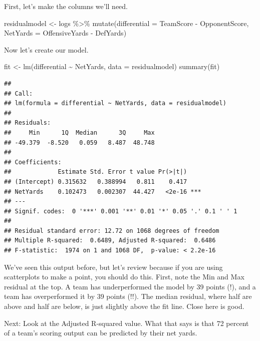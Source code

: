 \documentclass[
]{book}
\newenvironment{Shaded}{\begin{snugshade}}{\end{snugshade}}
\newcommand{\AttributeTok}[1]{\textcolor[rgb]{0.77,0.63,0.00}{#1}}
\newcommand{\FunctionTok}[1]{\textcolor[rgb]{0.00,0.00,0.00}{#1}}
\newcommand{\NormalTok}[1]{#1}
\newcommand{\OtherTok}[1]{\textcolor[rgb]{0.56,0.35,0.01}{#1}}
\newcommand{\SpecialCharTok}[1]{\textcolor[rgb]{0.00,0.00,0.00}{#1}}
\begin{document}
First, let's make the columns we'll need.

\begin{Shaded}
\begin{Highlighting}[]
\NormalTok{residualmodel }\OtherTok{\textless{}{-}}\NormalTok{ logs }\SpecialCharTok{\%\textgreater{}\%} \FunctionTok{mutate}\NormalTok{(}\AttributeTok{differential =}\NormalTok{ TeamScore }\SpecialCharTok{{-}}\NormalTok{ OpponentScore, }\AttributeTok{NetYards =}\NormalTok{ OffensiveYards }\SpecialCharTok{{-}}\NormalTok{ DefYards)}
\end{Highlighting}
\end{Shaded}

Now let's create our model.

\begin{Shaded}
\begin{Highlighting}[]
\NormalTok{fit }\OtherTok{\textless{}{-}} \FunctionTok{lm}\NormalTok{(differential }\SpecialCharTok{\textasciitilde{}}\NormalTok{ NetYards, }\AttributeTok{data =}\NormalTok{ residualmodel)}
\FunctionTok{summary}\NormalTok{(fit)}
\end{Highlighting}
\end{Shaded}

\begin{verbatim}
## 
## Call:
## lm(formula = differential ~ NetYards, data = residualmodel)
## 
## Residuals:
##     Min      1Q  Median      3Q     Max 
## -49.379  -8.520   0.059   8.487  48.748 
## 
## Coefficients:
##             Estimate Std. Error t value Pr(>|t|)    
## (Intercept) 0.315632   0.388994   0.811    0.417    
## NetYards    0.102473   0.002307  44.427   <2e-16 ***
## ---
## Signif. codes:  0 '***' 0.001 '**' 0.01 '*' 0.05 '.' 0.1 ' ' 1
## 
## Residual standard error: 12.72 on 1068 degrees of freedom
## Multiple R-squared:  0.6489, Adjusted R-squared:  0.6486 
## F-statistic:  1974 on 1 and 1068 DF,  p-value: < 2.2e-16
\end{verbatim}

We've seen this output before, but let's review because if you are using scatterplots to make a point, you should do this. First, note the Min and Max residual at the top. A team has underperformed the model by 39 points (!), and a team has overperformed it by 39 points (!!). The median residual, where half are above and half are below, is just slightly above the fit line. Close here is good.

Next: Look at the Adjusted R-squared value. What that says is that 72 percent of a team's scoring output can be predicted by their net yards.
\end{document}

